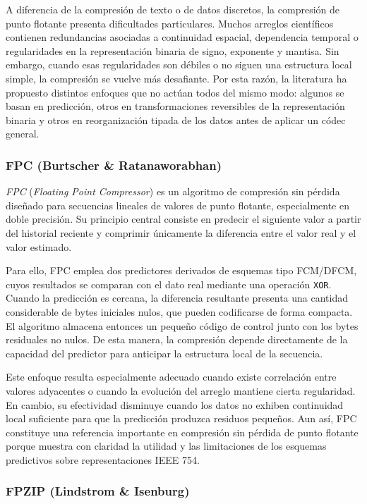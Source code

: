 A diferencia de la compresión de texto o de datos discretos, la compresión de punto
flotante presenta dificultades particulares. Muchos arreglos científicos contienen
redundancias asociadas a continuidad espacial, dependencia temporal o regularidades en
la representación binaria de signo, exponente y mantisa. Sin embargo, cuando esas
regularidades son débiles o no siguen una estructura local simple, la compresión se
vuelve más desafiante. Por esta razón, la literatura ha propuesto distintos enfoques que
no actúan todos del mismo modo: algunos se basan en predicción, otros en
transformaciones reversibles de la representación binaria y otros en reorganización
tipada de los datos antes de aplicar un códec general.

\subsubsection{FPC (Burtscher \& Ratanaworabhan)}

\textit{FPC} (\emph{Floating Point Compressor})\cite{burtscher2009fpc} es un algoritmo
de compresión sin pérdida diseñado para secuencias lineales de valores de punto
flotante, especialmente en doble precisión. Su principio central consiste en predecir el
siguiente valor a partir del historial reciente y comprimir únicamente la diferencia entre el
valor real y el valor estimado.

Para ello, FPC emplea dos predictores derivados de esquemas tipo FCM/DFCM, cuyos
resultados se comparan con el dato real mediante una operación \texttt{XOR}. Cuando la
predicción es cercana, la diferencia resultante presenta una cantidad considerable de
bytes iniciales nulos, que pueden codificarse de forma compacta. El algoritmo almacena
entonces un pequeño código de control junto con los bytes residuales no nulos. De esta
manera, la compresión depende directamente de la capacidad del predictor para anticipar
la estructura local de la secuencia.

Este enfoque resulta especialmente adecuado cuando existe correlación entre valores
adyacentes o cuando la evolución del arreglo mantiene cierta regularidad. En cambio, su
efectividad disminuye cuando los datos no exhiben continuidad local suficiente para que
la predicción produzca residuos pequeños. Aun así, FPC constituye una referencia
importante en compresión sin pérdida de punto flotante porque muestra con claridad la
utilidad y las limitaciones de los esquemas predictivos sobre representaciones IEEE 754.

\subsubsection{FPZIP (Lindstrom \& Isenburg)}

